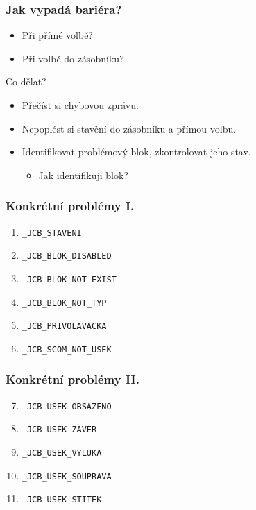 \documentclass[czech]{beamer}
\begin{document}
\begin{frame}
\frametitle{Jak vypadá bariéra?}
\begin{itemize}
\item Při přímé volbě?
\item Při volbě do zásobníku?
\end{itemize}


\begin{block}{Co dělat?}
\begin{itemize}
\item Přečíst si chybovou zprávu.
\item Nepoplést si stavění do zásobníku a přímou volbu.
\item Identifikovat problémový blok, zkontrolovat jeho stav.
	\begin{itemize}
	\item Jak identifikuji blok?
	\end{itemize}
\end{itemize}
\end{block}
\end{frame}


\begin{frame}[fragile]
\frametitle{Konkrétní problémy I.}
\begin{enumerate}
\item \verb+_JCB_STAVENI+
\item \verb+_JCB_BLOK_DISABLED+
\item \verb+_JCB_BLOK_NOT_EXIST+
\item \verb+_JCB_BLOK_NOT_TYP+
\item \verb+_JCB_PRIVOLAVACKA+

\item \verb+_JCB_SCOM_NOT_USEK+
\end{enumerate}
\end{frame}


\begin{frame}[fragile]
\frametitle{Konkrétní problémy II.}
\begin{enumerate}
\setcounter{enumi}{6}
\item \verb+_JCB_USEK_OBSAZENO+
\item \verb+_JCB_USEK_ZAVER+
\item \verb+_JCB_USEK_VYLUKA+
\item \verb+_JCB_USEK_SOUPRAVA+
\item \verb+_JCB_USEK_STITEK+
\end{enumerate}
\end{frame}
\end{document}
